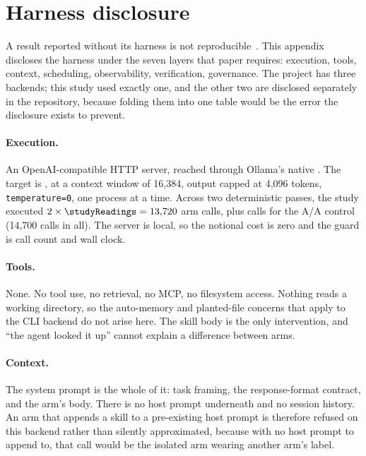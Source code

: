 \section{Harness disclosure}
\label{sec:appendix-harness}


A result reported without its harness is not
reproducible~\citep{harnessdisclosure2026}. This appendix discloses the
harness under the seven layers that paper requires: execution, tools,
context, scheduling, observability, verification, governance. The project
has three backends; this study used exactly one, and the other two are
disclosed separately in the repository, because folding them into one table
would be the error the disclosure exists to prevent.

\paragraph{Execution.} An OpenAI-compatible HTTP server, reached through
Ollama's native . The target is \texttt{\NUM{\studyModel}}, at
a context window of 16{,}384, output capped at 4{,}096 tokens,
\texttt{temperature=0}, one process at a time. Across two deterministic
passes, the study executed $2 \times \NUM{\studyReadings} = 13{,}720$ arm calls,
plus \NUM{\aaPairs} calls for the A/A control (14,700 calls in all). The server
is local, so the notional cost is zero and the guard is call count and wall clock.

\paragraph{Tools.} None. No tool use, no retrieval, no MCP, no filesystem
access. Nothing reads a working directory, so the auto-memory and
planted-file concerns that apply to the CLI backend do not arise here. The
skill body is the only intervention, and ``the agent looked it up'' cannot
explain a difference between arms.

\paragraph{Context.} The system prompt is the whole of it: task framing, the
response-format contract, and the arm's body. There is no host prompt
underneath and no session history. An arm that appends a skill to a
pre-existing host prompt is therefore refused on this backend rather than
silently approximated, because with no host prompt to append to, that call
would be the isolated arm wearing another arm's label.

